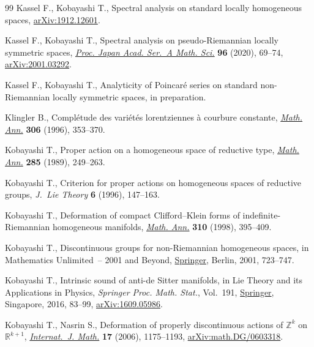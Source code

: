 \documentclass[10pt,a4paper]{amsart}
\numberwithin{equation}{section}
\begin{document}
\begin{thebibliography}{99}
Kassel F., Kobayashi T., Spectral analysis on standard locally homogeneous
 spaces, \href{https://arxiv.org/abs/1912.12601}{arXiv:1912.12601}.

Kassel F., Kobayashi T., Spectral analysis on pseudo-{R}iemannian locally
 symmetric spaces, \href{https://doi.org/10.3792/pjaa.96.013}{\textit{Proc. Japan Acad. Ser.~A Math. Sci.}} \textbf{96}
 (2020), 69--74, \href{https://arxiv.org/abs/2001.03292}{arXiv:2001.03292}.

Kassel F., Kobayashi T., Analyticity of {P}oincar\'e series on standard
 non-{R}iemannian locally symmetric spaces, in preparation.

Klingler B., Compl\'etude des vari\'et\'es lorentziennes \`a courbure
 constante, \href{https://doi.org/10.1007/BF01445255}{\textit{Math. Ann.}} \textbf{306} (1996), 353--370.

Kobayashi T., Proper action on a homogeneous space of reductive type,
 \href{https://doi.org/10.1007/BF01443517}{\textit{Math. Ann.}} \textbf{285} (1989), 249--263.

Kobayashi T., Criterion for proper actions on homogeneous spaces of reductive
 groups, \textit{J.~Lie Theory} \textbf{6} (1996), 147--163.

Kobayashi T., Deformation of compact {C}lifford--{K}lein forms of
 indefinite-{R}iemannian homogeneous manifolds, \href{https://doi.org/10.1007/s002080050153}{\textit{Math. Ann.}}
 \textbf{310} (1998), 395--409.

Kobayashi T., Discontinuous groups for non-{R}iemannian homogeneous spaces, in
 Mathematics Unlimited~-- 2001 and Beyond, \href{https://doi.org/10.1007/978-3-642-56478-9_37}{Springer}, Berlin, 2001, 723--747.

Kobayashi T., Intrinsic sound of anti-de {S}itter manifolds, in Lie Theory and
 its Applications in Physics, \textit{Springer Proc. Math. Stat.}, Vol.~191,
 \href{https://doi.org/10.1007/978-981-10-2636-2_6}{Springer}, Singapore, 2016, 83--99, \href{https://arxiv.org/abs/1609.05986}{arXiv:1609.05986}.

Kobayashi T., Nasrin S., Deformation of properly discontinuous actions of
 {${\mathbb Z}^k$} on {${\mathbb R}^{k+1}$}, \href{https://doi.org/10.1142/S0129167X06003862}{\textit{Internat.~J. Math.}}
 \textbf{17} (2006), 1175--1193, \href{https://arxiv.org/abs/math.DG/0603318}{arXiv:math.DG/0603318}.


\end{thebibliography}
\end{document}
